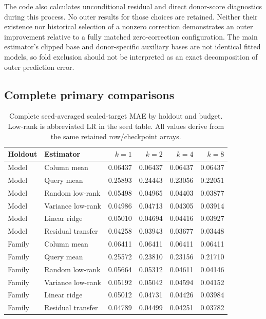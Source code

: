 \documentclass{article}
\begin{document}
The code also calculates unconditional residual and direct donor-score diagnostics during this process. No outer results for those choices are retained. Neither their existence nor historical selection of a nonzero correction demonstrates an outer improvement relative to a fully matched zero-correction configuration. The main estimator's clipped base and donor-specific auxiliary bases are not identical fitted models, so fold exclusion should not be interpreted as an exact decomposition of outer prediction error.

\subsection{Complete primary comparisons}
\begin{table}[h]
\centering
\small

\begin{tabular}{llrrrr}
\toprule
Holdout & Estimator & $k=1$ & $k=2$ & $k=4$ & $k=8$ \\
\midrule
Model & Column mean & 0.06437 & 0.06437 & 0.06437 & 0.06437 \\
Model & Query mean & 0.25893 & 0.24443 & 0.23056 & 0.22051 \\
Model & Random low-rank & 0.05498 & 0.04965 & 0.04403 & 0.03877 \\
Model & Variance low-rank & 0.04986 & 0.04713 & 0.04305 & 0.03914 \\
Model & Linear ridge & 0.05010 & 0.04694 & 0.04416 & 0.03927 \\
Model & Residual transfer & 0.04258 & 0.03943 & 0.03677 & 0.03448 \\
\midrule
Family & Column mean & 0.06411 & 0.06411 & 0.06411 & 0.06411 \\
Family & Query mean & 0.25572 & 0.23810 & 0.23156 & 0.21710 \\
Family & Random low-rank & 0.05664 & 0.05312 & 0.04611 & 0.04146 \\
Family & Variance low-rank & 0.05192 & 0.05042 & 0.04594 & 0.04152 \\
Family & Linear ridge & 0.05012 & 0.04731 & 0.04426 & 0.03984 \\
Family & Residual transfer & 0.04789 & 0.04499 & 0.04251 & 0.03782 \\
\bottomrule
\end{tabular}
\caption{Complete seed-averaged sealed-target MAE by holdout and budget. Low-rank is abbreviated LR in the seed table. All values derive from the same retained row/checkpoint arrays.}
\end{table}
\end{document}
